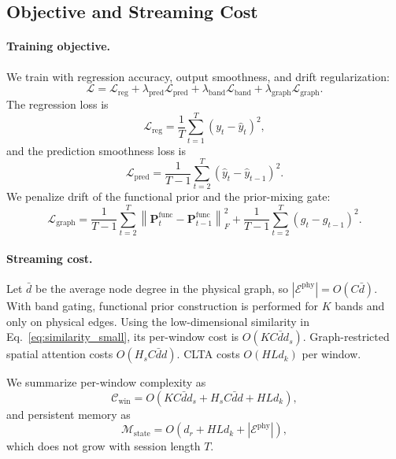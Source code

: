 \documentclass[preprint,12pt]{elsarticle}
\begin{document}
\subsection{Objective and Streaming Cost}
\label{sec:method_objective}


\paragraph{Training objective.}
We train with regression accuracy, output smoothness, and drift regularization:
\begin{equation}
\mathcal{L}
=
\mathcal{L}_{\mathrm{reg}}
+
\lambda_{\mathrm{pred}}\mathcal{L}_{\mathrm{pred}}
+
\lambda_{\mathrm{band}}\mathcal{L}_{\mathrm{band}}
+
\lambda_{\mathrm{graph}}\mathcal{L}_{\mathrm{graph}}.
\label{eq:final_loss}
\end{equation}
The regression loss is
\begin{equation}
\mathcal{L}_{\mathrm{reg}}
=
\frac{1}{T}\sum_{t=1}^{T}(y_t-\hat{y}_t)^2,
\label{eq:L_reg}
\end{equation}
and the prediction smoothness loss is
\begin{equation}
\mathcal{L}_{\mathrm{pred}}
=
\frac{1}{T-1}\sum_{t=2}^{T}(\hat{y}_{t}-\hat{y}_{t-1})^2.
\label{eq:L_pred}
\end{equation}
We penalize drift of the functional prior and the prior-mixing gate:
\begin{equation}
\mathcal{L}_{\mathrm{graph}}
=
\frac{1}{T-1}\sum_{t=2}^{T}\left\|\mathbf{P}^{\mathrm{func}}_{t}-\mathbf{P}^{\mathrm{func}}_{t-1}\right\|_{F}^{2}
+
\frac{1}{T-1}\sum_{t=2}^{T}(g_{t}-g_{t-1})^2.
\label{eq:L_graph}
\end{equation}

\paragraph{Streaming cost.}
Let $\bar{d}$ be the average node degree in the physical graph, so $|\mathcal{E}^{\mathrm{phy}}|=O(C\bar{d})$.
With band gating, functional prior construction is performed for $K$ bands and only on physical edges.
Using the low-dimensional similarity in Eq.~\eqref{eq:similarity_small}, its per-window cost is $O(KC\bar{d}d_s)$.
Graph-restricted spatial attention costs $O(H_sC\bar{d}d)$.
CLTA costs $O(HLd_k)$ per window.

We summarize per-window complexity as
\begin{equation}
\mathcal{C}_{\mathrm{win}}
=
O\!\left(KC\bar{d}d_s + H_sC\bar{d}d + HLd_k\right),
\label{eq:complexity_win}
\end{equation}
and persistent memory as
\begin{equation}
\mathcal{M}_{\mathrm{state}}
=
O\!\left(d_r + HLd_k + |\mathcal{E}^{\mathrm{phy}}|\right),
\label{eq:memory_state}
\end{equation}
which does not grow with session length $T$.
\end{document}
